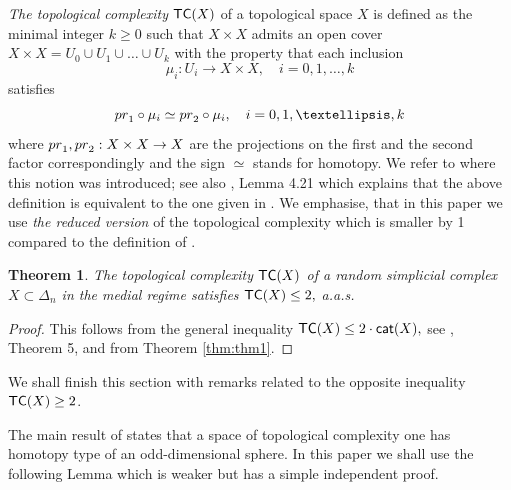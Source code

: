 \documentclass[10pt,a4paper]{amsart}
\newtheorem{teo}[lema]{Theorem}
\newcommand{\cat}{{\sf{cat}}}
\newcommand{\tc}{{\sf{TC}}}
\newcommand{\pr}{{\rm {pr}}}
\begin{document}
{\it The topological complexity} $\tc(X)$ of a topological space $X$ is defined as the minimal integer $k\ge 0$ such that $X\times X$ admits an open cover 
$X\times X=U_0\cup U_1\cup \dots \cup U_k$ with the property that each inclusion $$\mu_i: U_i\to X\times X, \quad i=0, 1, \dots, k$$ satisfies 
$${\pr}_1\circ \mu_{i}\simeq {\pr}_2\circ \mu_i, \quad i=0, 1, \dots, k$$ where
${\pr}_1, {\pr}_2: X\times X\to X$ are the projections on the first and the second factor correspondingly and the sign $\simeq$ stands for homotopy. 
We refer to \cite{Far0} where this notion was introduced;
see also \cite{Far2},  Lemma 4.21 which explains that the above definition is equivalent to the one given in \cite{Far0}. 
We emphasise, that in this paper we use {\it the reduced version} of the topological complexity which is smaller by 1 compared to the definition of \cite{Far0}. 

\begin{teo}\label{thm:tcle2}
The topological complexity  $\tc(X)$ of a random simplicial complex $X\subset \Delta_n$ in the medial regime satisfies
$
\tc(X)\le 2,
$
a.a.s.
\end{teo}
\begin{proof}
This follows from the general inequality 
$
\tc(X)\le 2\cdot \cat(X),
$
see \cite{Far0}, Theorem 5, and from Theorem \ref{thm:thm1}. 
\end{proof}

We shall finish this section with remarks related to the opposite inequality $\tc(X)\ge 2$. 


The main result of \cite{GLO} states that a space of topological complexity one has homotopy type of an odd-dimensional sphere. 
In this paper we shall use the following Lemma which is weaker but has a simple independent proof.  
\end{document}
